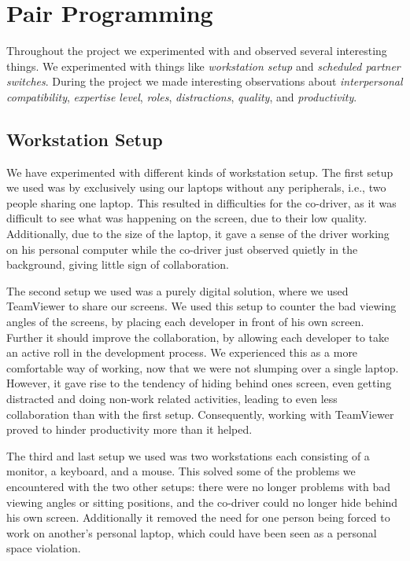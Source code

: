 \section{Pair Programming}
Throughout the project we experimented with and observed several interesting things.
We experimented with things like \textit{workstation setup} and \textit{scheduled partner switches}.
During the project we made interesting observations about \textit{interpersonal compatibility}, \textit{expertise level}, \textit{roles}, \textit{distractions}, \textit{quality}, and \textit{productivity}.

\subsection{Workstation Setup}
We have experimented with different kinds of workstation setup.
The first setup we used was by exclusively using our laptops without any peripherals, i.e., two people sharing one laptop.
This resulted in difficulties for the co-driver, as it was difficult to see what was happening on the screen, due to their low quality.
Additionally, due to the size of the laptop, it gave a sense of the driver working on his personal computer while the co-driver just observed quietly in the background, giving little sign of collaboration.

The second setup we used was a purely digital solution, where we used TeamViewer to share our screens.
We used this setup to counter the bad viewing angles of the screens, by placing each developer in front of his own screen.
Further it should improve the collaboration, by allowing each developer to take an active roll in the development process.
We experienced this as a more comfortable way of working, now that we were not slumping over a single laptop.
However, it gave rise to the tendency of hiding behind ones screen, even getting distracted and doing non-work related activities, leading to even less collaboration than with the first setup.
Consequently, working with TeamViewer proved to hinder productivity more than it helped.

The third and last setup we used was two workstations each consisting of a monitor, a keyboard, and a mouse.
This solved some of the problems we encountered with the two other setups: there were no longer problems with bad viewing angles or sitting positions, and the co-driver could no longer hide behind his own screen.
Additionally it removed the need for one person being forced to work on another's personal laptop, which could have been seen as a personal space violation.

